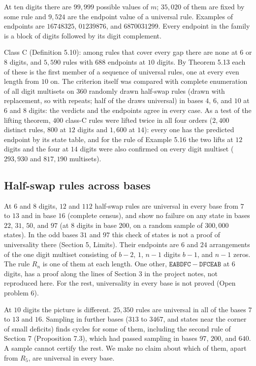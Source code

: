 \documentclass[11pt,letterpaper]{article}
\theoremstyle{paperstyle}
\theoremstyle{paperstyledef}
\theoremstyle{paperstylerem}
\begin{document}
At ten digits there are \(99{,}999\) possible values of \(m\); \(35{,}020\) of them are fixed by some rule and \(9{,}524\) are the endpoint value of a universal rule. Examples of endpoints are \(16748325\), \(01239876\), and \(6870031299\). Every endpoint in the family is a block of digits followed by its digit complement.

Class C (Definition 5.10): among rules that cover every gap there are none at \(6\) or \(8\) digits, and \(5{,}590\) rules with \(688\) endpoints at \(10\) digits. By Theorem 5.13 each of these is the first member of a sequence of universal rules, one at every even length from \(10\) on. The criterion itself was compared with complete enumeration of all digit multisets on \(360\) randomly drawn half-swap rules (drawn with replacement, so with repeats; half of the draws universal) in bases \(4\), \(6\), and \(10\) at \(6\) and \(8\) digits: the verdicts and the endpoints agree in every case. As a test of the lifting theorem, \(400\) class-C rules were lifted twice in all four orders (\(2{,}400\) distinct rules, \(800\) at \(12\) digits and \(1{,}600\) at \(14\)): every one has the predicted endpoint by its state table, and for the rule of Example 5.16 the two lifts at \(12\) digits and the four at \(14\) digits were also confirmed on every digit multiset (\(293{,}930\) and \(817{,}190\) multisets).

\subsection{Half-swap rules across bases}\label{half-swap-rules-across-bases}

At \(6\) and \(8\) digits, \(12\) and \(112\) half-swap rules are universal in every base from \(7\) to \(13\) and in base \(16\) (complete census), and show no failure on any state in bases \(22\), \(31\), \(50\), and \(97\) (at \(8\) digits in base \(200\), on a random sample of \(300{,}000\) states). In the odd bases \(31\) and \(97\) this check of states is not a proof of universality there (Section 5, Limits). Their endpoints are \(6\) and \(24\) arrangements of the one digit multiset consisting of \(b-2\), \(1\), \(n-1\) digits \(b-1\), and \(n-1\) zeros. The rule \(R_n\) is one of them at each length. One other, \(\mathtt{EABDFC} - \mathtt{DFCEAB}\) at \(6\) digits, has a proof along the lines of Section 3 in the project notes, not reproduced here. For the rest, universality in every base is not proved (Open problem 6).

At \(10\) digits the picture is different. \(25{,}350\) rules are universal in all of the bases \(7\) to \(13\) and \(16\). Sampling in further bases (\(313\) to \(3467\), and states near the corner of small deficits) finds cycles for some of them, including the second rule of Section 7 (Proposition 7.3), which had passed sampling in bases \(97\), \(200\), and \(640\). A sample cannot certify the rest. We make no claim about which of them, apart from \(R_5\), are universal in every base.
\end{document}
